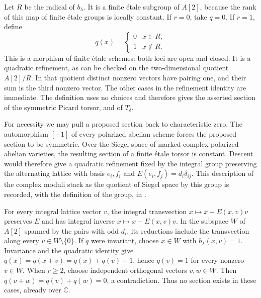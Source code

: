 Let $R$ be the radical of $b_\lambda$.  It is a finite étale subgroup
of $A[2]$, because the rank of this map of finite étale groups is locally
constant.  If $r=0$, take $q=0$.  If $r=1$, define
\[
 q(x)=\begin{cases}0&x\in R,\\1&x\notin R.\end{cases}
\]
This is a morphism of finite étale schemes: both loci are open and
closed.  It is a quadratic refinement, as can be checked on the
two-dimensional quotient $A[2]/R$.  In that quotient distinct nonzero
vectors have pairing one, and their sum is the third nonzero vector.
The other cases in the refinement identity are immediate.  The
definition uses no choices and therefore gives the asserted section
of the symmetric Picard torsor, and of $T_\delta$.

For necessity we may pull a proposed section back to characteristic
zero.  The automorphism $[-1]$ of every polarized abelian scheme
forces the proposed section to be symmetric.  Over the Siegel space
of marked complex polarized abelian varieties, the resulting section
of a finite étale torsor is constant.  Descent would therefore give
a quadratic refinement fixed by the integral group preserving the
alternating lattice with basis $e_i,f_i$ and
$E(e_i,f_j)=d_i\delta_{ij}$.  This description of the complex moduli
stack as the quotient of Siegel space by this group is recorded, with
the definition of the group, in \cite[\S\S5.3--5.4, pp.~30--33]{DGJ_Laga2025}.

For every integral lattice vector $v$, the integral transvection
$x\mapsto x+E(x,v)v$ preserves $E$ and has integral inverse
$x\mapsto x-E(x,v)v$.  In the subspace $W$ of $A[2]$ spanned by the
pairs with odd $d_i$, its reductions include the transvection along
every $v\in W\setminus\{0\}$.  If $q$ were invariant, choose $x\in W$
with $b_\lambda(x,v)=1$.  Invariance and the quadratic identity give
$q(x)=q(x+v)=q(x)+q(v)+1$, hence $q(v)=1$ for every nonzero $v\in W$.
When $r\geq2$, choose independent orthogonal vectors $v,w\in W$.
Then $q(v+w)=q(v)+q(w)=0$, a contradiction.  Thus no section exists
in these cases, already over $\mathbb C$.

